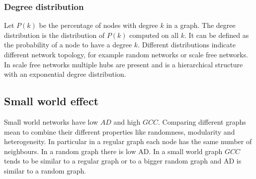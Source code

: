 		\subsubsection{Degree distribution}
		Let $P(k)$ be the percentage of nodes with degree $k$ in a graph.
		The degree distribution is the distribution of $P(k)$ computed on all $k$.
		It can be defined as the probability of a node to have a degree $k$.
		Different distributions indicate different network topology, for example random networks or scale free networks.
		In scale free networks multiple hubs are present and is a hierarchical structure with an exponential degree distribution.

	\subsection{Small world effect}
	Small world networks have low $AD$ and high $GCC$.
	Comparing different graphs mean to combine their different properties like randomness, modularity and heterogeneity.
	In particular in a regular graph each node has the same number of neighbours.
	In a random graph there is low AD.
	In a small world graph $GCC$ tends to be similar to a regular graph or to a bigger random graph and AD is similar to a random graph.
